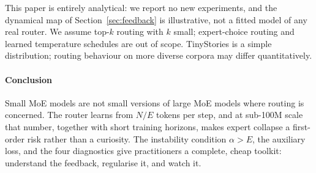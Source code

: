 This paper is entirely analytical: we report no new experiments, and
the dynamical map of Section~\ref{sec:feedback} is illustrative, not
a fitted model of any real router. We assume top-$k$ routing with
$k$ small; expert-choice routing and learned temperature schedules
are out of scope. TinyStories is a simple distribution; routing
behaviour on more diverse corpora may differ quantitatively.

\paragraph{Conclusion}

Small MoE models are not small versions of large MoE models where
routing is concerned. The router learns from $N/E$ tokens per step,
and at sub-100M scale that number, together with short training
horizons, makes expert collapse a first-order risk rather than a
curiosity. The instability condition $\alpha > E$, the auxiliary
loss, and the four diagnostics give practitioners a complete,
cheap toolkit: understand the feedback, regularise it, and watch it.
